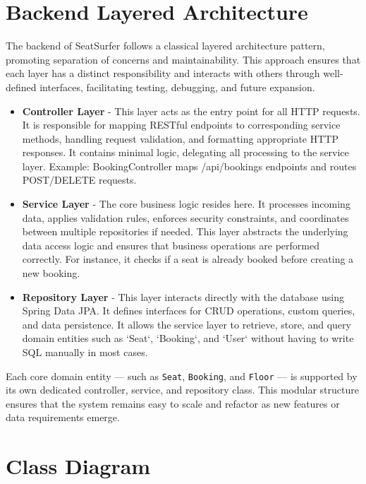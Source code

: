 \documentclass[12pt,a4paper]{report} %
\begin{document}
\section{Backend Layered Architecture}

The backend of SeatSurfer follows a classical layered architecture pattern, promoting separation of concerns and maintainability. This approach ensures that each layer has a distinct responsibility and interacts with others through well-defined interfaces, facilitating testing, debugging, and future expansion.

\begin{itemize}
\item \textbf{Controller Layer} - This layer acts as the entry point for all HTTP requests. It is responsible for mapping RESTful endpoints to corresponding service methods, handling request validation, and formatting appropriate HTTP responses. It contains minimal logic, delegating all processing to the service layer. Example: BookingController maps /api/bookings endpoints and routes POST/DELETE requests.
\item \textbf{Service Layer} - The core business logic resides here. It processes incoming data, applies validation rules, enforces security constraints, and coordinates between multiple repositories if needed. This layer abstracts the underlying data access logic and ensures that business operations are performed correctly. For instance, it checks if a seat is already booked before creating a new booking.
\item \textbf{Repository Layer} - This layer interacts directly with the database using Spring Data JPA. It defines interfaces for CRUD operations, custom queries, and data persistence. It allows the service layer to retrieve, store, and query domain entities such as `Seat`, `Booking`, and `User` without having to write SQL manually in most cases.
\end{itemize}

Each core domain entity — such as \texttt{Seat}, \texttt{Booking}, and \texttt{Floor} — is supported by its own dedicated controller, service, and repository class. This modular structure ensures that the system remains easy to scale and refactor as new features or data requirements emerge.

\section{Class Diagram}
\end{document}
